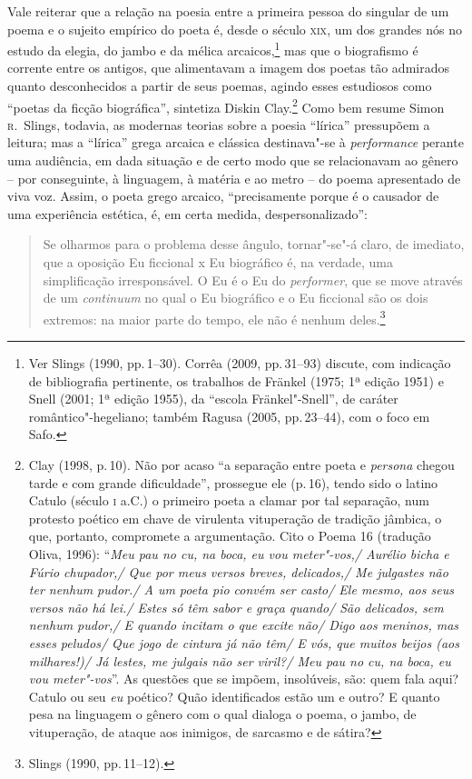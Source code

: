 Vale reiterar que a relação na poesia entre a primeira pessoa do
singular de um poema e o sujeito empírico do poeta é, desde o século \textsc{xix}, um
dos grandes nós no estudo da elegia, do jambo e da mélica arcaicos,\footnote{
Ver Slings (1990, pp.\,1--30). Corrêa (2009, pp.\,31--93) discute, com indicação de
bibliografia pertinente, os trabalhos de Fränkel (1975; 1ª edição
1951) e Snell (2001; 1ª edição 1955), da “escola Fränkel"-Snell”, de
caráter romântico"-hegeliano; também Ragusa (2005, pp.\,23--44), com o foco em
Safo.} mas que o biografismo é corrente entre os antigos, que alimentavam a
imagem dos poetas tão admirados quanto desconhecidos a partir de seus poemas,
agindo esses estudiosos como “poetas da ficção biográfica”, sintetiza Diskin
Clay.\footnote{ Clay (1998, p.\,10). Não por acaso “a separação entre poeta e
\textit{persona} chegou tarde e com grande dificuldade”, prossegue ele (p.\,16),
tendo sido o latino Catulo (século \textsc{i} a.C.) o primeiro poeta a clamar por tal
separação, num protesto poético em chave de virulenta vituperação de tradição
jâmbica, o que, portanto, compromete a argumentação. Cito o Poema 16 (tradução
Oliva, 1996): ``\textit{Meu pau no cu, na boca, eu vou meter"-vos,/ Aurélio bicha
e Fúrio chupador,/ Que por meus versos breves, delicados,/ Me julgastes não
ter nenhum pudor./ A um poeta pio convém ser casto/ Ele mesmo, aos seus
versos não há lei./ Estes só têm sabor e graça quando/ São delicados, sem
nenhum pudor,/ E quando incitam o que excite não/ Digo aos meninos, mas esses
peludos/ Que jogo de cintura já não têm/ E vós, que muitos beijos (aos
milhares!)/ Já lestes, me julgais não ser viril?/ Meu pau no cu, na boca, eu
vou meter"-vos}''. As questões que se impõem, insolúveis, são: quem fala
aqui? Catulo ou seu \textit{eu} poético? Quão identificados estão um e outro? E quanto
pesa na linguagem o gênero com o qual dialoga o poema, o jambo, de vituperação,
de ataque aos inimigos, de sarcasmo e de sátira?} Como bem resume Simon \textsc{r}.~Slings, 
todavia, as modernas teorias sobre a poesia “lírica”
pressupõem a leitura; mas a “lírica” grega arcaica e clássica destinava"-se à
\textit{performance} perante uma audiência, em dada situação e de certo modo
que se relacionavam ao gênero -- por conseguinte, à linguagem, à matéria e ao
metro -- do poema apresentado de viva voz. Assim, o poeta grego arcaico,
“precisamente porque é o causador de uma experiência estética, é, em certa
medida, despersonalizado”:

\begin{quote}
Se olharmos para o problema desse ângulo, tornar"-se"-á claro, de imediato, que
a oposição Eu ficcional x Eu biográfico é, na verdade, uma simplificação
irresponsável. O Eu é o Eu do \textit{performer}, que se move através de um
\textit{continuum} no qual o Eu biográfico e o Eu ficcional são os dois
extremos: na maior parte do tempo, ele não é nenhum deles.\footnote{ Slings (1990, pp.\,11--12).}
\end{quote}


